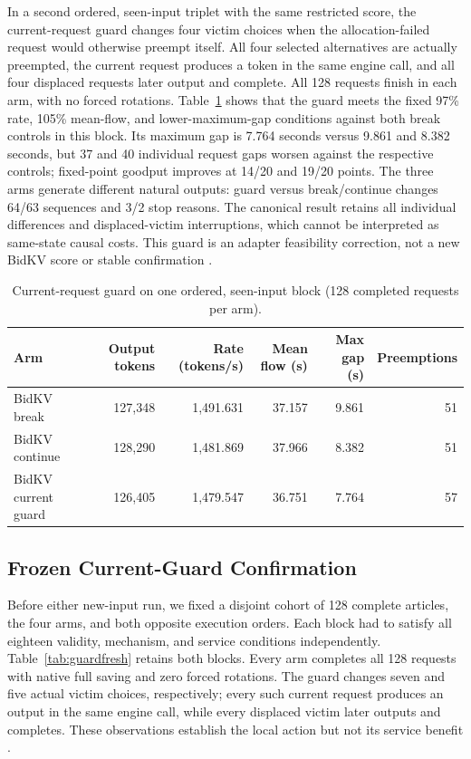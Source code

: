 \documentclass[10pt]{article}
\begin{document}
In a second ordered, seen-input triplet with the same restricted score, the current-request guard changes four victim choices when the allocation-failed request would otherwise preempt itself. All four selected alternatives are actually preempted, the current request produces a token in the same engine call, and all four displaced requests later output and complete. All 128 requests finish in each arm, with no forced rotations. Table~\ref{tab:bidkvcurrentguard} shows that the guard meets the fixed 97\% rate, 105\% mean-flow, and lower-maximum-gap conditions against both break controls in this block. Its maximum gap is 7.764 seconds versus 9.861 and 8.382 seconds, but 37 and 40 individual request gaps worsen against the respective controls; fixed-point goodput improves at 14/20 and 19/20 points. The three arms generate different natural outputs: guard versus break/continue changes 64/63 sequences and 3/2 stop reasons. The canonical result retains all individual differences and displaced-victim interruptions, which cannot be interpreted as same-state causal costs. This guard is an adapter feasibility correction, not a new BidKV score or stable confirmation \cite{bidkvguardresult}.

\begin{table}[t]
\centering\small
\caption{Current-request guard on one ordered, seen-input block (128 completed requests per arm).}
\label{tab:bidkvcurrentguard}
\begin{tabular}{lrrrrr}
\toprule
Arm & Output tokens & Rate (tokens/s) & Mean flow (s) & Max gap (s) & Preemptions \\
\midrule
BidKV break & 127,348 & 1,491.631 & 37.157 & 9.861 & 51 \\
BidKV continue & 128,290 & 1,481.869 & 37.966 & 8.382 & 51 \\
BidKV current guard & 126,405 & 1,479.547 & 36.751 & 7.764 & 57 \\
\bottomrule
\end{tabular}
\end{table}

\subsection{Frozen Current-Guard Confirmation}
Before either new-input run, we fixed a disjoint cohort of 128 complete articles, the four arms, and both opposite execution orders. Each block had to satisfy all eighteen validity, mechanism, and service conditions independently. Table~\ref{tab:guardfresh} retains both blocks. Every arm completes all 128 requests with native full saving and zero forced rotations. The guard changes seven and five actual victim choices, respectively; every such current request produces an output in the same engine call, while every displaced victim later outputs and completes. These observations establish the local action but not its service benefit \cite{guardfreshtwo}.
\end{document}
